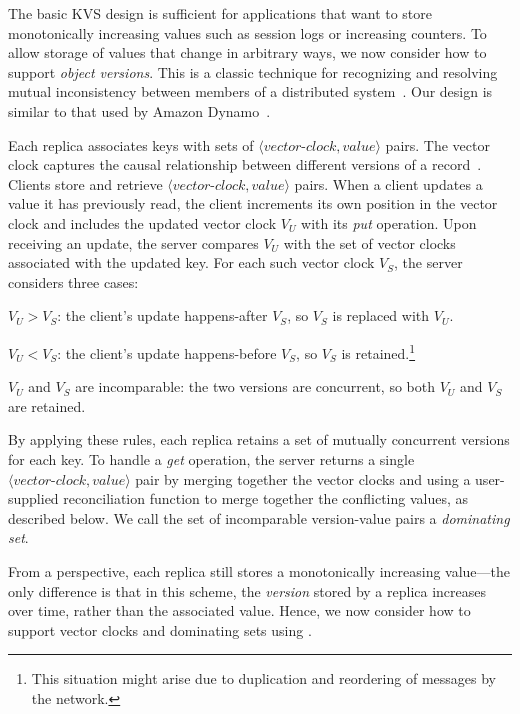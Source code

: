 The basic KVS design is sufficient for applications that want to store
monotonically increasing values such as session logs or increasing counters. To
allow storage of values that change in arbitrary ways, we now consider how to
support \emph{object versions}. This is a classic technique for recognizing and resolving
mutual inconsistency between members of a distributed system~\cite{Parker1983}.
Our design is similar to that used by Amazon Dynamo~\cite{DeCandia2007}.

Each replica associates keys with sets of
$\langle\textit{vector-clock},\textit{value}\rangle$ pairs. The vector clock
captures the causal relationship between different versions of a
record~\cite{Fidge1988,Mattern1989}. Clients store and retrieve
$\langle\textit{vector-clock},\textit{value}\rangle$ pairs. When a client
updates a value it has previously read, the client increments its own position
in the vector clock and includes the updated vector clock $V_U$ with its
\emph{put} operation. Upon receiving an update, the server compares $V_U$ with
the set of vector clocks associated with the updated key. For each such vector
clock $V_S$, the server considers three cases:
\begin{compactenum}
\item $V_U > V_S$: the client's update happens-after $V_S$, so $V_S$ is replaced
  with $V_U$.
\item $V_U < V_S$: the client's update happens-before $V_S$, so $V_S$ is
  retained.\footnote{This situation might arise due to duplication and
    reordering of messages by the network.}
\item $V_U$ and $V_S$ are incomparable: the two versions are concurrent, so
  both $V_U$ and $V_S$ are retained.
\end{compactenum}
By applying these rules, each replica retains a set of mutually concurrent
versions for each key. To handle a \emph{get} operation, the server returns a
single $\langle\textit{vector-clock},\textit{value}\rangle$ pair by merging
together the vector clocks and using a user-supplied reconciliation function to
merge together the conflicting values, as described below. We call the set of
incomparable version-value pairs a \emph{dominating set}.

From a \lang perspective, each replica still stores a monotonically increasing
value---the only difference is that in this scheme, the \emph{version} stored by
a replica increases over time, rather than the associated value. Hence, we now
consider how to support vector clocks and dominating sets using \lang.

